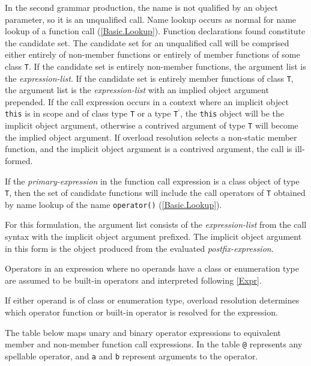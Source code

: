 \p In the second grammar production, the name is not qualified by an object
parameter, so it is an unqualified call. Name lookup occurs as normal for name
lookup of a function call (\ref{Basic.Lookup}). Function declarations found
constitute the candidate set. The candidate set for an unqualified call will be
comprised either entirely of non-member functions or entirely of member
functions of some class \texttt{T}. If the candidate set is entirely non-member
functions, the argument list is the \textit{expression-list}. If the candidate set is
entirely member functions of class \texttt{T}, the argument list is the
\textit{expression-list} with an implied object argument prepended. If the call
expression occurs in a context where an implicit object \texttt{this} is in scope and
of class type \texttt{T} or a type \texttt{T$^\prime$}, the \texttt{this} object will be the implicit object
argument, otherwise a contrived argument of type \texttt{T} will become the implied
object argument. If overload resolution selects a non-static member function,
and the implicit object argument is a contrived argument, the call is
ill-formed.


\p If the \textit{primary-expression} in the function call expression is a class object of
type \texttt{T}, then the set of candidate functions will include the call operators of
\texttt{T} obtained by name lookup of the name \texttt{operator()} (\ref{Basic.Lookup}).

\p For this formulation, the argument list consists of the \textit{expression-list} from
the call syntax with the implicit object argument prefixed. The implicit object
argument in this form is the object produced from the evaluated
\textit{postfix-expression}.


\p Operators in an expression where no operands have a class or enumeration type
are assumed to be built-in operators and interpreted following \ref{Expr}.

\p If either operand is of class or enumeration type, overload resolution
determines which operator function or built-in operator is resolved for the
expression.

\p The table below maps unary and binary operator expressions to equivalent member
and non-member function call expressions. In the table \texttt{@} represents any
spellable operator, and \texttt{a} and \texttt{b} represent arguments to the operator.

